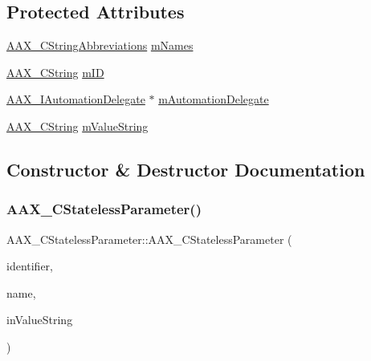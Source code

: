 \subsection*{Protected Attributes}
\begin{DoxyCompactItemize}
\item 
\mbox{\hyperlink{a01577}{A\+A\+X\+\_\+\+C\+String\+Abbreviations}} \mbox{\hyperlink{a01541_a435122fdc399b8733d2d6a0a5d03ede0}{m\+Names}}
\item 
\mbox{\hyperlink{a01573}{A\+A\+X\+\_\+\+C\+String}} \mbox{\hyperlink{a01541_a9fe3a08c63ad9f1993bb0eeddb1a3bcc}{m\+ID}}
\item 
\mbox{\hyperlink{a01773}{A\+A\+X\+\_\+\+I\+Automation\+Delegate}} $\ast$ \mbox{\hyperlink{a01541_ae5a1336d5b23ab6d72756eb14d14a517}{m\+Automation\+Delegate}}
\item 
\mbox{\hyperlink{a01573}{A\+A\+X\+\_\+\+C\+String}} \mbox{\hyperlink{a01541_ad9d69aab224d8a96250611b0961c75d1}{m\+Value\+String}}
\end{DoxyCompactItemize}


\subsection{Constructor \& Destructor Documentation}
\mbox{\label{a01541_aa3c39b846a18c151d0f2295b0b93050e}} 
\subsubsection{\texorpdfstring{AAX\_CStatelessParameter()}{AAX\_CStatelessParameter()}\hspace{0.1cm}{\footnotesize\ttfamily [1/2]}}
{\footnotesize\ttfamily A\+A\+X\+\_\+\+C\+Stateless\+Parameter\+::\+A\+A\+X\+\_\+\+C\+Stateless\+Parameter (\begin{DoxyParamCaption}\item[{\mbox{\hyperlink{a00392_a1440c756fe5cb158b78193b2fc1780d1}{A\+A\+X\+\_\+\+C\+Param\+ID}}}]{identifier,  }\item[{const \mbox{\hyperlink{a01873}{A\+A\+X\+\_\+\+I\+String}} \&}]{name,  }\item[{const \mbox{\hyperlink{a01873}{A\+A\+X\+\_\+\+I\+String}} \&}]{in\+Value\+String }\end{DoxyParamCaption})\hspace{0.3cm}{\ttfamily [inline]}}

